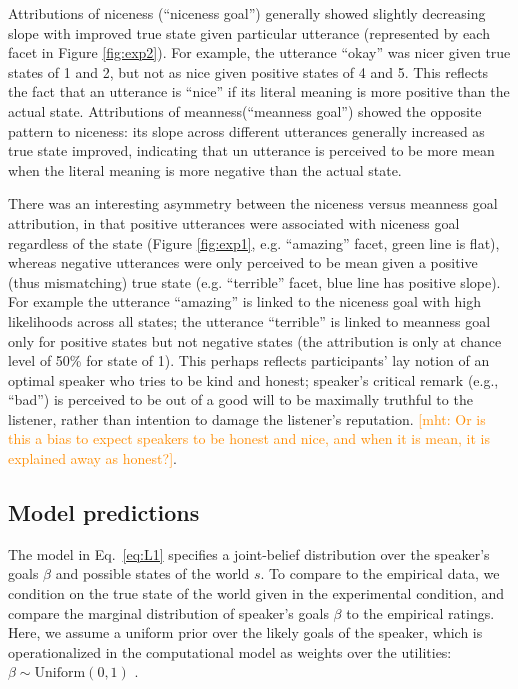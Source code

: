 \documentclass[10pt,letterpaper]{article}
\newcommand{\mht}[1]{\textcolor{DarkOrange}{[mht: #1]}}
\begin{document}
Attributions of niceness (``niceness goal'') generally showed slightly decreasing slope with improved true state given particular utterance (represented by each facet in Figure \ref{fig:exp2}). For example, the utterance ``okay'' was nicer given true states of 1 and 2, but not as nice given positive states of 4 and 5. This reflects the fact that an utterance is ``nice'' if its literal meaning is more positive than the actual state. Attributions of meanness(``meanness goal'') showed the opposite pattern to niceness: its slope across different utterances generally increased as true state improved, indicating that un utterance is perceived to be more mean when the literal meaning is more negative than the actual state.

There was an interesting asymmetry between the niceness versus meanness goal attribution, in that positive utterances were associated with niceness goal regardless of the state (Figure \ref{fig:exp1}, e.g. ``amazing'' facet, green line is flat), whereas negative utterances were only perceived to be mean given a positive (thus mismatching) true state (e.g. ``terrible'' facet, blue line has positive slope). For example the utterance ``amazing'' is linked to the niceness goal with high likelihoods across all states; the utterance ``terrible'' is linked to meanness goal only for positive states but not negative states (the attribution is only at chance level of 50\% for state of 1). This perhaps reflects participants' lay notion of an optimal speaker who tries to be kind and honest; speaker's critical remark (e.g., ``bad'') is perceived to be out of a good will to be maximally truthful to the listener, rather than intention to damage the listener's reputation. \mht{Or is this a bias to expect speakers to be honest and nice, and when it is mean, it is explained away as honest?}.

\subsection{Model predictions}

The model in Eq.~\ref{eq:L1} specifies a joint-belief distribution over the speaker's goals $\beta$ and possible states of the world $s$.
To compare to the empirical data, we condition on the true state of the world given in the experimental condition, and compare the marginal distribution of speaker's goals $\beta$ to the empirical ratings.
Here, we assume a uniform prior over the likely goals of the speaker, which is operationalized in the computational model as weights over the utilities: $\beta \sim \text{Uniform}(0,1)$ .
\end{document}
